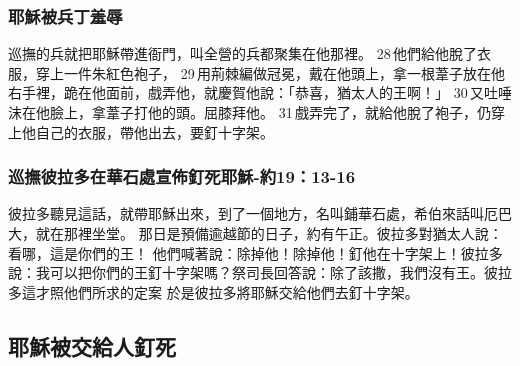 \subsubsection{耶穌被兵丁羞辱}
巡撫的兵就把耶穌帶進衙門，叫全營的兵都聚集在他那裡。 28 他們給他脫了衣服，穿上一件朱紅色袍子， 29 用荊棘編做冠冕，戴在他頭上，拿一根葦子放在他右手裡，跪在他面前，戲弄他，就慶賀他說：「恭喜，猶太人的王啊！」 30 又吐唾沫在他臉上，拿葦子打他的頭。屈膝拜他。 31 戲弄完了，就給他脫了袍子，仍穿上他自己的衣服，帶他出去，要釘十字架。

\subsubsection{巡撫彼拉多在華石處宣佈釘死耶穌-約19：13-16}
彼拉多聽見這話，就帶耶穌出來，到了一個地方，名叫鋪華石處，希伯來話叫厄巴大，就在那裡坐堂。
那日是預備逾越節的日子，約有午正。彼拉多對猶太人說：看哪，這是你們的王！
他們喊著說：除掉他！除掉他！釘他在十字架上！彼拉多說：我可以把你們的王釘十字架嗎？祭司長回答說：除了該撒，我們沒有王。彼拉多這才照他們所求的定案
於是彼拉多將耶穌交給他們去釘十字架。



\subsection{耶穌被交給人釘死}

